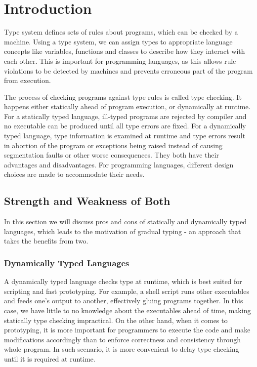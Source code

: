 
\renewcommand{\thechapter}{1}

\chapter{Introduction}

Type system defines sets of rules about programs, which can be checked by a machine.
Using a type system, we can assign types to appropriate language concepts like variables, functions and classes to describe how they interact with each other.
This is important for programming languages, as this allows rule violations
to be detected by machines and prevents erroneous part of the program from execution.


The process of checking programs against type rules is called type checking.
It happens either statically ahead of program execution, or dynamically at runtime.
For a statically typed language, ill-typed programs are rejected by compiler and
no executable can be produced until all type errors are fixed. For a dynamically
typed language, type information is examined at runtime and type errors result
in abortion of the program or exceptions being raised
instead of causing segmentation faults or other worse consequences.
They both have their advantages and disadvantages.
For programming languages, different design choices are made to
accommodate their needs.

\section{Strength and Weakness of Both}

In this section we will discuss pros and cons of
statically and dynamically typed languages,
which leads to the motivation of gradual typing - an approach that takes the benefits from two.

\subsection{Dynamically Typed Languages}

A dynamically typed language checks type at runtime, which is best suited for scripting and fast prototyping.
For example, a shell script runs other executables and feeds one's output to another, effectively gluing programs together.
In this case, we have little to no knowledge about the executables ahead of time, making statically type checking impractical.
On the other hand, when it comes to prototyping, it is more important for programmers to execute the code and make modifications accordingly
than to enforce correctness and consistency through whole program.
In such scenario, it is more convenient to delay type checking until
it is required at runtime.


